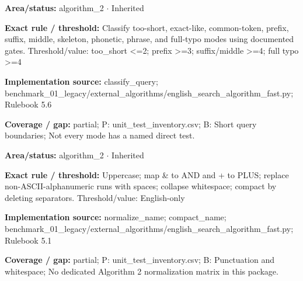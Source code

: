 \begin{tcolorbox}[enhanced,breakable,colback=white,colframe=Muted!45,boxrule=0.45pt,arc=1.5pt,left=6pt,right=6pt,top=5pt,bottom=5pt,title={\texttt{A2-MODES-08}},title after break={\texttt{A2-MODES-08}\ (continued)},fonttitle=\headingfont\bfseries\color{Navy},coltitle=Navy]
\textbf{Area/status:} algorithm\_\allowbreak{}2 $\boldsymbol{\cdot}$ Inherited\par
\smallskip
\textbf{Exact rule / threshold:} Classify too-short, exact-like, common-token, prefix, suffix, middle, skeleton, phonetic, phrase, and full-typo modes using documented gates. Threshold/\allowbreak{}value: too\_\allowbreak{}short <=2; prefix >=3; suffix/\allowbreak{}middle >=4; full typo >=4\par
\smallskip
\textbf{Implementation source:} classify\_\allowbreak{}query; benchmark\_\allowbreak{}01\_\allowbreak{}legacy/\allowbreak{}external\_\allowbreak{}algorithms/\allowbreak{}english\_\allowbreak{}search\_\allowbreak{}algorithm\_\allowbreak{}fast.py; Rulebook 5.6\par
\smallskip
\textbf{Coverage / gap:} partial; P: unit\_\allowbreak{}test\_\allowbreak{}inventory.csv; B: Short query boundaries; Not every mode has a named direct test.
\end{tcolorbox}
\begin{tcolorbox}[enhanced,breakable,colback=white,colframe=Muted!45,boxrule=0.45pt,arc=1.5pt,left=6pt,right=6pt,top=5pt,bottom=5pt,title={\texttt{A2-NORMALIZE-01}},title after break={\texttt{A2-NORMALIZE-01}\ (continued)},fonttitle=\headingfont\bfseries\color{Navy},coltitle=Navy]
\textbf{Area/status:} algorithm\_\allowbreak{}2 $\boldsymbol{\cdot}$ Inherited\par
\smallskip
\textbf{Exact rule / threshold:} Uppercase; map \& to AND and + to PLUS; replace non-ASCII-alphanumeric runs with spaces; collapse whitespace; compact by deleting separators. Threshold/\allowbreak{}value: English-only\par
\smallskip
\textbf{Implementation source:} normalize\_\allowbreak{}name; compact\_\allowbreak{}name; benchmark\_\allowbreak{}01\_\allowbreak{}legacy/\allowbreak{}external\_\allowbreak{}algorithms/\allowbreak{}english\_\allowbreak{}search\_\allowbreak{}algorithm\_\allowbreak{}fast.py; Rulebook 5.1\par
\smallskip
\textbf{Coverage / gap:} partial; P: unit\_\allowbreak{}test\_\allowbreak{}inventory.csv; B: Punctuation and whitespace; No dedicated Algorithm 2 normalization matrix in this package.
\end{tcolorbox}
